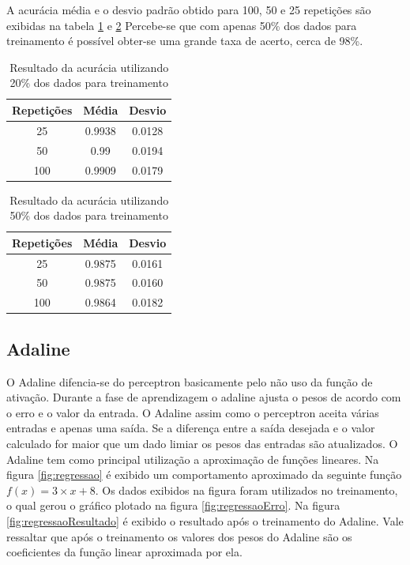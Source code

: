 \documentclass[12pt,journal,onecolumn]{IEEEtran}
\begin{document}
A acurácia média e o desvio padrão obtido para 100, 50 e 25 repetições são
exibidas na tabela \ref{tab:acurrSet}  e \ref{tab:acurrSet2} Percebe-se que com
apenas 50\% dos dados para treinamento é possível obter-se uma grande taxa de
acerto, cerca de 98\%.


\begin{table}[!htbp]  
\caption{Resultado da acurácia utilizando 20\%
				 dos dados para treinamento}
\label{tab:acurrSet}
\centering
	\begin{tabular}{| c | c | c |}
		\hline
		 Repetições & Média & Desvio \\ \hline
		 25      & 0.9938   & 0.0128 \\ \hline
		 50      & 0.99     & 0.0194 \\ \hline
		 100 	 & 0.9909   & 0.0179 \\ 
		\hline
	\end{tabular}
\end{table}


\begin{table}[!htbp]  
\caption{Resultado da acurácia utilizando 50\%
				 dos dados para treinamento}						 
\label{tab:acurrSet2}
\centering
	\begin{tabular}{| c | c | c |}
		\hline
		 Repetições & Média & Desvio \\ \hline
		 25      & 0.9875   & 0.0161 \\ \hline
		 50      & 0.9875   & 0.0160 \\ \hline
		 100 	 & 0.9864   & 0.0182 \\ 
		\hline
	\end{tabular}
\end{table}


\subsection{Adaline}
O Adaline difencia-se do perceptron basicamente pelo não uso da função de
ativação. Durante a fase de aprendizagem o adaline ajusta o pesos de acordo com
o erro e o valor da entrada. O Adaline assim como o perceptron aceita várias
entradas e apenas uma saída. Se a diferença entre a saída desejada e o valor
calculado for maior que um dado limiar os pesos das entradas são atualizados.
O Adaline tem como principal utilização a aproximação de funções lineares.
Na figura \ref{fig:regressao} é exibido um comportamento aproximado da seguinte
função $f(x)=3 \times x + 8$. Os dados exibidos na figura foram utilizados no
treinamento, o qual gerou o gráfico plotado na figura \ref{fig:regressaoErro}.
Na figura \ref{fig:regressaoResultado} é exibido o resultado após o treinamento
do Adaline. Vale ressaltar que após o treinamento os valores dos pesos do
Adaline são os coeficientes da função linear aproximada por ela.
\end{document}
